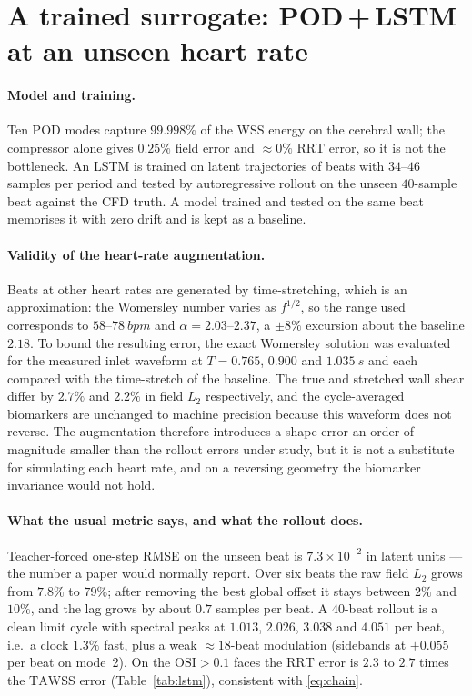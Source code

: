 \documentclass[11pt,a4paper]{article}
\newcommand{\TAWSS}{\mathrm{TAWSS}}
\newcommand{\OSI}{\mathrm{OSI}}
\newcommand{\RRT}{\mathrm{RRT}}
\begin{document}
\section{A trained surrogate: POD\,+\,LSTM at an unseen heart rate}
\label{sec:lstm}

\paragraph{Model and training.}
Ten POD modes capture $99.998\%$ of the WSS energy on the cerebral wall; the
compressor alone gives $0.25\%$ field error and $\approx0\%$ $\RRT$ error, so
it is not the bottleneck. An LSTM is trained on latent trajectories of beats
with $34$--$46$ samples per period and tested by autoregressive rollout on
the unseen $40$-sample beat against the CFD truth. A model trained and tested
on the same beat memorises it with zero drift and is kept as a baseline.

\paragraph{Validity of the heart-rate augmentation.}
Beats at other heart rates are generated by time-stretching, which is an
approximation: the Womersley number varies as $f^{1/2}$, so the range used
corresponds to $58$--$\SI{78}{bpm}$ and $\alpha=2.03$--$2.37$, a $\pm8\%$
excursion about the baseline $2.18$. To bound the resulting error, the exact
Womersley solution was evaluated for the measured inlet waveform at
$T=0.765$, $0.900$ and $\SI{1.035}{s}$ and each compared with the
time-stretch of the baseline. The true and stretched wall shear differ by
$2.7\%$ and $2.2\%$ in field $L_2$ respectively, and the cycle-averaged
biomarkers are unchanged to machine precision because this waveform does not
reverse. The augmentation therefore introduces a shape error an order of
magnitude smaller than the rollout errors under study, but it is not a
substitute for simulating each heart rate, and on a reversing geometry the
biomarker invariance would not hold.

\paragraph{What the usual metric says, and what the rollout does.}
Teacher-forced one-step RMSE on the unseen beat is $7.3\times10^{-2}$ in
latent units --- the number a paper would normally report. Over six beats the
raw field $L_2$ grows from $7.8\%$ to $79\%$; after removing the best global
offset it stays between $2\%$ and $10\%$, and the lag grows by about $0.7$
samples per beat. A $40$-beat rollout is a clean limit cycle with spectral
peaks at $1.013$, $2.026$, $3.038$ and $4.051$ per beat, i.e.\ a clock
$1.3\%$ fast, plus a weak $\approx18$-beat modulation (sidebands at $+0.055$
per beat on mode~2). On the $\OSI>0.1$ faces the $\RRT$ error is $2.3$ to
$2.7$ times the $\TAWSS$ error (Table~\ref{tab:lstm}), consistent with
\eqref{eq:chain}.
\end{document}
